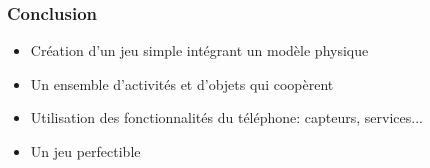 \documentclass[handout]{beamer}
\begin{document}
\begin{frame}
  \frametitle<1->{Conclusion}
    \begin{itemize}
      \item <1->{Création d'un jeu simple intégrant un modèle physique}%
      \item <2->{Un ensemble d'activités et d'objets qui coopèrent}%
      \item <3->{Utilisation des fonctionnalités du téléphone: capteurs, services...}%
      \item <4->{Un jeu perfectible}%
   \end{itemize}
\end{frame}
\end{document}
